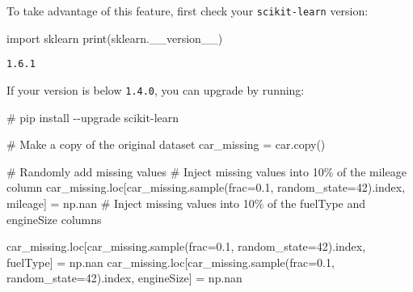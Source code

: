 \documentclass[
  letterpaper,
  DIV=11,
  numbers=noendperiod]{scrreprt}
\newenvironment{Shaded}{\begin{snugshade}}{\end{snugshade}}
\newcommand{\BuiltInTok}[1]{\textcolor[rgb]{0.00,0.23,0.31}{#1}}
\newcommand{\CommentTok}[1]{\textcolor[rgb]{0.37,0.37,0.37}{#1}}
\newcommand{\DecValTok}[1]{\textcolor[rgb]{0.68,0.00,0.00}{#1}}
\newcommand{\FloatTok}[1]{\textcolor[rgb]{0.68,0.00,0.00}{#1}}
\newcommand{\ImportTok}[1]{\textcolor[rgb]{0.00,0.46,0.62}{#1}}
\newcommand{\NormalTok}[1]{\textcolor[rgb]{0.00,0.23,0.31}{#1}}
\newcommand{\OperatorTok}[1]{\textcolor[rgb]{0.37,0.37,0.37}{#1}}
\newcommand{\StringTok}[1]{\textcolor[rgb]{0.13,0.47,0.30}{#1}}
\begin{document}
To take advantage of this feature, first check your
\texttt{scikit-learn} version:

\begin{Shaded}
\begin{Highlighting}[]
\ImportTok{import}\NormalTok{ sklearn}
\BuiltInTok{print}\NormalTok{(sklearn.\_\_version\_\_)}
\end{Highlighting}
\end{Shaded}

\begin{verbatim}
1.6.1
\end{verbatim}

If your version is below \texttt{1.4.0}, you can upgrade by running:

\begin{Shaded}
\begin{Highlighting}[]
\CommentTok{\# pip install {-}{-}upgrade scikit{-}learn}
\end{Highlighting}
\end{Shaded}

\begin{Shaded}
\begin{Highlighting}[]
\CommentTok{\# Make a copy of the original dataset}
\NormalTok{car\_missing }\OperatorTok{=}\NormalTok{ car.copy()}

\CommentTok{\# Randomly add missing values}
\CommentTok{\# Inject missing values into 10\% of the \textquotesingle{}mileage\textquotesingle{} column}
\NormalTok{car\_missing.loc[car\_missing.sample(frac}\OperatorTok{=}\FloatTok{0.1}\NormalTok{, random\_state}\OperatorTok{=}\DecValTok{42}\NormalTok{).index, }\StringTok{\textquotesingle{}mileage\textquotesingle{}}\NormalTok{] }\OperatorTok{=}\NormalTok{ np.nan}
\CommentTok{\# Inject missing values into 10\% of the \textquotesingle{}fuelType\textquotesingle{} and \textquotesingle{}engineSize\textquotesingle{} columns}

\NormalTok{car\_missing.loc[car\_missing.sample(frac}\OperatorTok{=}\FloatTok{0.1}\NormalTok{, random\_state}\OperatorTok{=}\DecValTok{42}\NormalTok{).index, }\StringTok{\textquotesingle{}fuelType\textquotesingle{}}\NormalTok{] }\OperatorTok{=}\NormalTok{ np.nan}
\NormalTok{car\_missing.loc[car\_missing.sample(frac}\OperatorTok{=}\FloatTok{0.1}\NormalTok{, random\_state}\OperatorTok{=}\DecValTok{42}\NormalTok{).index, }\StringTok{\textquotesingle{}engineSize\textquotesingle{}}\NormalTok{] }\OperatorTok{=}\NormalTok{ np.nan}
\end{Highlighting}
\end{Shaded}
\end{document}
